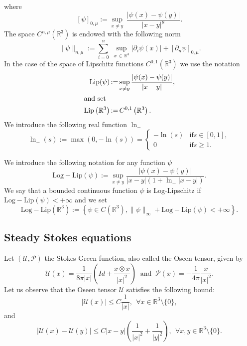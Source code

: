 \documentclass[AHL,Unicode,longabstracts,published]{cedram}
\newcommand{\Lip}{\mathrm{Lip}}
\newcommand{\LLip}{\mathrm{Log-Lip}}
\newcommand{\R}{\mathbb{R}}
\newcommand{\clP}{\mathcal{P}}
\newcommand{\clU}{\mathcal{U}}
\renewcommand{\leq}{\leqslant}
\renewcommand{\geq}{\geqslant}
\let\oldforall\forall
\renewcommand*{\forall}{\mathrel{\oldforall}}
\begin{document}
where
\[
[\psi]_{0,\mu} := \underset{x \neq y}{\sup}\, \frac{|\psi (x)-\psi (y)|}{|x-y|^\mu}.
\]
The space $ C^{n,\mu}(\R^3)$ is endowed with the following norm
\[
\|\psi\|_{n,\mu}:= \underset{i=0}{\overset{n}{\sum}}\;\underset{x\,\in\,\R^3}{\sup}|\partial_i \psi(x)|+ [\partial_n \psi]_{0,\mu}.
\]
In the case of the space of Lipschitz functions $ C^{0,1}(\R^3) $ we use the notation
\begin{align*}
\Lip(\psi)\, &{:=}\, \underset{x \neq y}{\sup}\, \frac{|\psi(x)-\psi(y)|}{|x-y|},
\\
\intertext{and set}
\Lip\left(\R^3\right)\, &{:=}\, C^{0,1}\left(\R^3\right).
\end{align*}
We introduce the following real function $\ln_{-}$
\begin{equation}\label{def_ln-}
\ln_{-}(s):=\max(0,-\ln(s))=
\begin{cases}
-\ln(s) &\text{if} s\in[0,1], \\
0 &\text{if} s \geq 1.
\end{cases}
\end{equation}
\begin{defi}\label{def:LLspace}
We introduce the following notation for any function $\psi$
\[
\LLip(\psi):= \underset{x \neq y}{\sup} \frac{|\psi(x)-\psi(y)|}{|x-y|(1+\ln_{-}|x-y|)}.
\]
We say that a bounded continuous function $\psi$ is Log-Lipschitz if\ $\LLip(\psi)<+\infty$ and we set
\[
\LLip\left(\R^3\right):=\left\{\psi \in C\left(\R^3\right), \|\psi\|_\infty+ \LLip(\psi)<+\infty \right\}.
\]
\end{defi}



\subsection{Steady Stokes equations}\label{SSE}


Let $(\clU,\clP)$ the Stokes Green function, also called the Oseen tensor, given by
\begin{equation}\label{Oseen}
\clU(x)= \frac{1}{8\pi |x|} \left(Id + \frac{x \otimes x}{|x|^2} \right) \ \text{ and } \ \clP(x)=- \frac{1}{4\pi} \frac{x}{|x|^2}.
\end{equation}
Let us observe that the Oseen tensor $\clU$ satisfies the following bound:
\begin{equation}\label{B-prop}
\left|\clU(x) \right|\leq C \frac{1}{|x|}, \: \: \forall x \in \R^3 \setminus \{0\},
\end{equation}
and
\begin{equation}\label{Lip-prop}
\left|\clU(x)-\clU(y) \right|\leq C |x-y| \left(\frac{1}{|x|^2}+ \frac{1}{|y|^2} \right), \: \: \forall x, y \in \R^3 \setminus \{0\}.
\end{equation}
\end{document}
